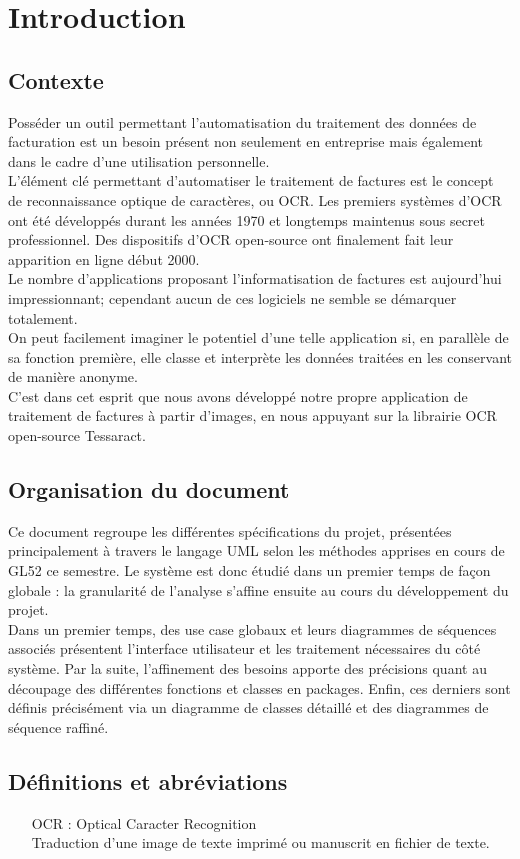 \chapter{Introduction}

\section{Contexte}

Posséder un outil permettant l'automatisation du traitement des données de facturation est un besoin présent non seulement en entreprise mais également dans le cadre d'une utilisation personnelle.\\

L'élément clé permettant d'automatiser le traitement de factures est le concept de reconnaissance optique de caractères, ou OCR. 
Les premiers systèmes d'OCR ont été développés durant les années 1970 et longtemps maintenus sous secret professionnel. Des dispositifs d'OCR open-source ont finalement fait leur apparition en ligne début 2000.\\

Le nombre d'applications proposant l'informatisation de factures est aujourd'hui impressionnant; cependant aucun de ces logiciels ne semble se démarquer totalement.\\

On peut facilement imaginer le potentiel d'une telle application si, en parallèle de sa fonction première, elle classe et interprète les données traitées en les conservant de manière anonyme.\\

C'est dans cet esprit que nous avons développé notre propre application de traitement de factures à partir d'images, en nous appuyant sur la librairie OCR open-source Tessaract.

\section{Organisation du document}
Ce document regroupe les différentes spécifications du projet, présentées principalement à travers le langage UML selon les méthodes apprises en cours de GL52 ce semestre. Le système est donc étudié dans un premier temps de façon globale : la granularité de l'analyse s'affine ensuite au cours du développement du projet.\\
Dans un premier temps, des use case globaux et leurs diagrammes de séquences associés présentent l'interface utilisateur et les traitement nécessaires du côté système. Par la suite, l'affinement des besoins apporte des précisions quant au découpage des différentes fonctions et classes en packages. Enfin, ces derniers sont définis précisément via un diagramme de classes détaillé et des diagrammes de séquence raffiné.

\section{Définitions et abréviations}
\begin{enumerate}[label=\bfseries]
	\item[{OCR :}] Optical Caracter Recognition \\
	Traduction d'une image de texte imprimé ou manuscrit en fichier de texte.
\end{enumerate}

